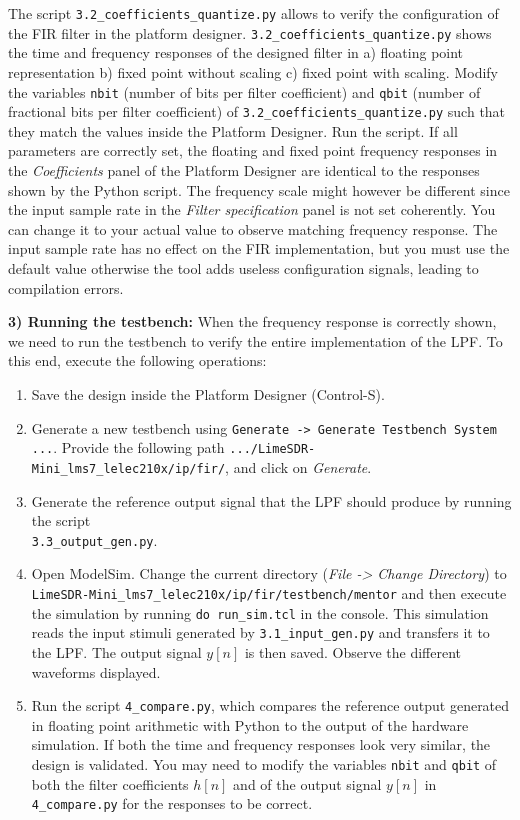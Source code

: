 The script \texttt{3.2\_coefficients\_quantize.py} allows to verify the configuration of the FIR filter in the platform designer. \texttt{3.2\_coefficients\_quantize.py} shows the time and frequency responses of the designed filter in a) floating point representation b) fixed point without scaling c) fixed point with scaling. Modify the variables \texttt{nbit} (number of bits per filter coefficient) and \texttt{qbit} (number of fractional bits per filter coefficient) of \texttt{3.2\_coefficients\_quantize.py} such that they match the values inside the Platform Designer. Run the script. If all parameters are correctly set, the floating and fixed point frequency responses in the \textit{Coefficients} panel of the Platform Designer are identical to the responses shown by the Python script. The frequency scale might however be different since the input sample rate in the \textit{Filter specification} panel is not set coherently. You can change it to your actual value to observe matching frequency response. The input sample rate has no effect on the FIR implementation, but you must use the default value otherwise the tool adds useless configuration signals, leading to compilation errors.

\textbf{3) Running the testbench:}
When the frequency response is correctly shown, we need to run the testbench to verify the entire implementation of the LPF. To this end, execute the following operations:
\begin{enumerate}
    \item Save the design inside the Platform Designer (Control-S).
    \item Generate a new testbench using \texttt{Generate -> Generate Testbench System ...}. Provide the following path
    \texttt{.../LimeSDR-Mini\_lms7\_lelec210x/ip/fir/}, and click on \textit{Generate}.
    \item Generate the reference output signal that the LPF should produce by running the script \\ \texttt{3.3\_output\_gen.py}.
    \item Open ModelSim. Change the current directory (\textit{File -> Change Directory}) to \\ \texttt{LimeSDR-Mini\_lms7\_lelec210x/ip/fir/testbench/mentor} and then execute the simulation by running \texttt{do run\_sim.tcl} in the console.
    This simulation reads the input stimuli generated by
    \texttt{3.1\_input\_gen.py} and transfers it to the LPF. The output signal $y[n]$ is then saved. Observe the different waveforms displayed.
    \item Run the script \texttt{4\_compare.py}, which compares the reference output generated in floating point arithmetic with Python to the output of the hardware simulation. If both the time and frequency responses look very similar, the design is validated.
    You may need to modify the variables \texttt{nbit} and \texttt{qbit} of both the filter coefficients $h[n]$ and of the output signal $y[n]$ in \texttt{4\_compare.py} for the responses to be correct.
\end{enumerate}


